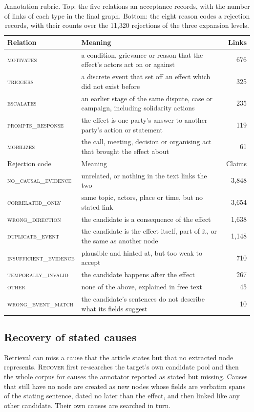 \documentclass[pdflatex,sn-basic,lineno]{sn-jnl}
\theoremstyle{thmstylethree}
\theoremstyle{thmstyleone}
\newcommand{\rel}[1]{\textsc{#1}}
\begin{document}
\begin{table}[!htbp]
\caption{Annotation rubric. Top: the five relations an acceptance records, with the number of
links of each type in the final graph. Bottom: the eight reason codes a rejection records, with
their counts over the 11{,}320 rejections of the three expansion levels.}
\label{tab:rubric}
\footnotesize
\begin{tabularx}{\textwidth}{@{}lXr@{}}
\toprule
Relation & Meaning & Links \\
\midrule
\rel{motivates} & a condition, grievance or reason that the effect's actors act on or against &
676 \\
\rel{triggers} & a discrete event that set off an effect which did not exist before & 325 \\
\rel{escalates} & an earlier stage of the same dispute, case or campaign, including solidarity
actions & 235 \\
\rel{prompts\_response} & the effect is one party's answer to another party's action or statement &
119 \\
\rel{mobilizes} & the call, meeting, decision or organising act that brought the effect about & 61 \\
\midrule
Rejection code & Meaning & Claims \\
\midrule
\rel{no\_causal\_evidence} & unrelated, or nothing in the text links the two & 3{,}848 \\
\rel{correlated\_only} & same topic, actors, place or time, but no stated link & 3{,}654 \\
\rel{wrong\_direction} & the candidate is a consequence of the effect & 1{,}638 \\
\rel{duplicate\_event} & the candidate is the effect itself, part of it, or the same as another
node & 1{,}148 \\
\rel{insufficient\_evidence} & plausible and hinted at, but too weak to accept & 710 \\
\rel{temporally\_invalid} & the candidate happens after the effect & 267 \\
\rel{other} & none of the above, explained in free text & 45 \\
\rel{wrong\_event\_match} & the candidate's sentences do not describe what its fields suggest & 10 \\
\bottomrule
\end{tabularx}
\end{table}

\subsection{Recovery of stated causes}
Retrieval can miss a cause that the article states but that no extracted node represents.
\textsc{Recover} first re-searches the target's own candidate pool and then the whole corpus for
causes the annotator reported as stated but missing. Causes that still have no node are created as
new nodes whose fields are verbatim spans of the stating sentence, dated no later than the effect,
and then linked like any other candidate. Their own causes are searched in turn.
\end{document}
